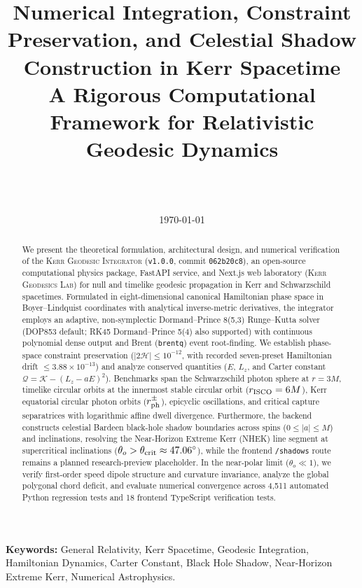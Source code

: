 \documentclass[11pt,a4paper]{article}
\title{
    \vspace{-1.5cm}
    \textbf{\Large Numerical Integration, Constraint Preservation, and Celestial Shadow Construction in Kerr Spacetime} \\[0.5em]
    \large A Rigorous Computational Framework for Relativistic Geodesic Dynamics
}
\author{
    \textbf{\ReportAuthorName} \\
    \texttt{\ReportAuthorEmail} \\[0.3em]
    \small \ReportAuthorAffiliation
}
\date{\today}
\numberwithin{equation}{section}
\numberwithin{figure}{section}
\numberwithin{table}{section}
\begin{document}
\maketitle

\begin{abstract}
We present the theoretical formulation, architectural design, and numerical verification of the \textsc{Kerr Geodesic Integrator} (\texttt{v1.0.0}, commit \texttt{062b20c8}), an open-source computational physics package, FastAPI service, and Next.js web laboratory (\textsc{Kerr Geodesics Lab}) for null and timelike geodesic propagation in Kerr and Schwarzschild spacetimes. Formulated in eight-dimensional canonical Hamiltonian phase space in Boyer--Lindquist coordinates with analytical inverse-metric derivatives, the integrator employs an adaptive, non-symplectic Dormand--Prince 8(5,3) Runge--Kutta solver (\textsc{DOP853} default; \textsc{RK45} Dormand--Prince 5(4) also supported) with continuous polynomial dense output and Brent (\texttt{brentq}) event root-finding. We establish phase-space constraint preservation ($|2\mathcal{H}| \le 10^{-12}$, with recorded seven-preset Hamiltonian drift $\le 3.88 \times 10^{-13}$) and analyze conserved quantities ($E$, $L_z$, and Carter constant $\mathcal{Q} = \mathcal{K} - (L_z - aE)^2$). Benchmarks span the Schwarzschild photon sphere at $r=3M$, timelike circular orbits at the innermost stable circular orbit ($r_{\rm ISCO} = 6M$), Kerr equatorial circular photon orbits ($r_{\rm ph}^\pm$), epicyclic oscillations, and critical capture separatrices with logarithmic affine dwell divergence. Furthermore, the backend constructs celestial Bardeen black-hole shadow boundaries across spins ($0 \le |a| \le M$) and inclinations, resolving the Near-Horizon Extreme Kerr (NHEK) line segment at supercritical inclinations ($\theta_o > \theta_{\rm crit} \approx 47.06^\circ$), while the frontend \texttt{/shadows} route remains a planned research-preview placeholder. In the near-polar limit ($\theta_o \ll 1$), we verify first-order speed dipole structure and curvature invariance, analyze the global polygonal chord deficit, and evaluate numerical convergence across 4,511 automated Python regression tests and 18 frontend TypeScript verification tests.
\end{abstract}

\vspace{0.5cm}
\noindent\textbf{Keywords:} General Relativity, Kerr Spacetime, Geodesic Integration, Hamiltonian Dynamics, Carter Constant, Black Hole Shadow, Near-Horizon Extreme Kerr, Numerical Astrophysics.
\end{document}
